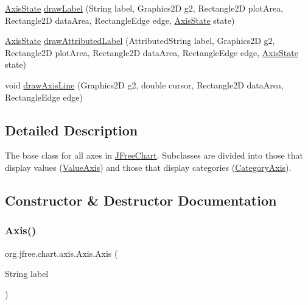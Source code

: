 \begin{DoxyCompactItemize}
\item 
\mbox{\hyperlink{classorg_1_1jfree_1_1chart_1_1axis_1_1_axis_state}{Axis\+State}} \mbox{\hyperlink{classorg_1_1jfree_1_1chart_1_1axis_1_1_axis_a65bde0aa3cb97d30d6ea851a04fa2149}{draw\+Label}} (String label, Graphics2D g2, Rectangle2D plot\+Area, Rectangle2D data\+Area, Rectangle\+Edge edge, \mbox{\hyperlink{classorg_1_1jfree_1_1chart_1_1axis_1_1_axis_state}{Axis\+State}} state)
\item 
\mbox{\hyperlink{classorg_1_1jfree_1_1chart_1_1axis_1_1_axis_state}{Axis\+State}} \mbox{\hyperlink{classorg_1_1jfree_1_1chart_1_1axis_1_1_axis_ab76b74bf8fd6c89986562ae97c52cbee}{draw\+Attributed\+Label}} (Attributed\+String label, Graphics2D g2, Rectangle2D plot\+Area, Rectangle2D data\+Area, Rectangle\+Edge edge, \mbox{\hyperlink{classorg_1_1jfree_1_1chart_1_1axis_1_1_axis_state}{Axis\+State}} state)
\item 
void \mbox{\hyperlink{classorg_1_1jfree_1_1chart_1_1axis_1_1_axis_a2ba8b09f72a281d9f22590875f1a45a0}{draw\+Axis\+Line}} (Graphics2D g2, double cursor, Rectangle2D data\+Area, Rectangle\+Edge edge)
\end{DoxyCompactItemize}


\subsection{Detailed Description}
The base class for all axes in \mbox{\hyperlink{classorg_1_1jfree_1_1chart_1_1_j_free_chart}{J\+Free\+Chart}}. Subclasses are divided into those that display values (\mbox{\hyperlink{classorg_1_1jfree_1_1chart_1_1axis_1_1_value_axis}{Value\+Axis}}) and those that display categories (\mbox{\hyperlink{classorg_1_1jfree_1_1chart_1_1axis_1_1_category_axis}{Category\+Axis}}). 

\subsection{Constructor \& Destructor Documentation}
\mbox{\label{classorg_1_1jfree_1_1chart_1_1axis_1_1_axis_ad6d2fd5fd4c7643e102148374dda78c1}} 
\subsubsection{\texorpdfstring{Axis()}{Axis()}}
{\footnotesize\ttfamily org.\+jfree.\+chart.\+axis.\+Axis.\+Axis (\begin{DoxyParamCaption}\item[{String}]{label }\end{DoxyParamCaption})\hspace{0.3cm}{\ttfamily [protected]}}

